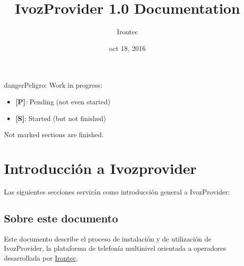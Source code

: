 \documentclass[letterpaper,10pt,spanish]{sphinxmanual}
\title{IvozProvider 1.0 Documentation}
\date{oct 18, 2016}
\author{Irontec}
\begin{document}
\maketitle
\tableofcontents
{}\label{index::doc}
\begin{notice}{danger}{Peligro:}
Work in progress:
\begin{itemize}
\item {} 
\textbf{{[}P{]}}: Pending (not even started)

\item {} 
\textbf{{[}S{]}}: Started (but not finished)

\end{itemize}

Not marked sections are finished.
\end{notice}




\chapter{Introducción a Ivozprovider}
\label{intro/index:documentacion-oficial-de-ivozprovider}\label{intro/index::doc}\label{intro/index:introduccion-a-ivozprovider}
Las siguientes secciones servirán como introducción general a IvozProvider:


\section{Sobre este documento}
\label{intro/about:sobre-este-documento}\label{intro/about::doc}
Este documento describe el proceso de instalación y de utilización de IvozProvider, la plataforma de telefonía multinivel orientada a operadores desarrollada por \href{http://irontec.com}{Irontec}.
\end{document}
